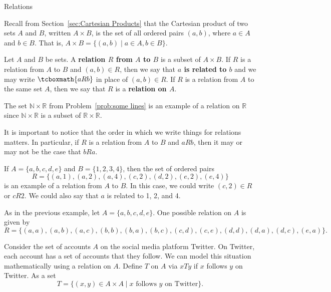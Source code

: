 \begin{section}{Relations}

Recall from Section~\ref{sec:Cartesian Products} that the Cartesian product of two sets $A$ and $B$, written $A\times B$, is the set of all ordered pairs $(a,b)$, where $a\in A$ and $b\in B$. That is, $A\times B=\{(a,b)\mid a\in A, b\in B\}$.

\begin{definition}
Let $A$ and $B$ be sets. A \textbf{relation $R$ from $A$ to $B$} is a subset of $A \times B$. If $R$ is a relation from $A$ to $B$ and $(a,b)\in {R}$, then we say that \textbf{$a$ is related to $b$} and we may write $\tcboxmath{aR b}$ in place of $(a,b)\in{R}$. If $R$ is a relation from $A$ to the same set $A$, then we say that $R$ is a \textbf{relation on $A$}.
\end{definition}

\begin{example}
The set $\mathbb{N}\times \mathbb{R}$ from Problem~\ref{prob:some lines} is an example of a relation on $\mathbb{R}$ since $\mathbb{N}\times \mathbb{R}$ is a subset of $\mathbb{R}\times \mathbb{R}$.
\end{example}

It is important to notice that the order in which we write things for relations matters.  In particular, if $R$ is a relation from $A$ to $B$ and $a R b$, then it may or may not be the case that $bR a$.

\begin{example}\label{ex:relation finite to finite}
If $A=\{a,b,c,d,e\}$ and $B=\{1,2,3,4\}$, then the set of ordered pairs
\[
R=\{(a,1),(a,2),(a,4),(c,2),(d,2),(e,2),(e,4)\}
\]
is an example of a relation from $A$ to $B$. In this case, we could write $(c,2)\in{R}$ or $cR 2$. We could also say that $a$ is related to 1, 2, and 4. 
\end{example}

\begin{example}\label{ex:relation on finite}
As in the previous example, let $A=\{a,b,c,d,e\}$. One possible relation on $A$ is given by
\[
R=\{(a,a),(a,b),(a,c),(b,b),(b,a),(b,c),(c,d),(c,e),(d,d),(d,a),(d,c),(e,a)\}.
\]
\end{example}

\begin{example}\label{ex:Twitter}
Consider the set of accounts $A$ on the social media platform Twitter.  On Twitter, each account has a set of accounts that they follow.  We can model this situation mathematically using a relation on $A$.  Define $T$ on $A$ via $xTy$ if  $x$ follows $y$ on Twitter. As a set
\[
T=\{(x,y)\in A\times A\mid x\text{ follows }y\text{ on Twitter}\}.
\]
\end{example}


\end{section}
